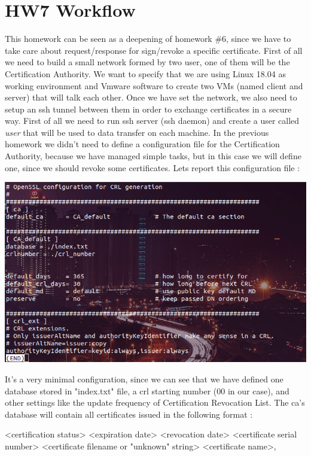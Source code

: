 \documentclass[11pt]{article}
\begin{document}
\section{HW7 Workflow}
This homework can be seen as a deepening of homework \#6, since we have to take care about request/response for sign/revoke a specific certificate. First of all we need to build a small network formed by two user, one of them will be the Certification Authority. We want to specify that we are using Linux 18.04 as working environment and Vmware software to create two VMs (named client and server) that will talk each other. Once we have set the network, we also need to setup an ssh tunnel between them in order to exchange certificates in a secure way. First of all we need to run ssh server (ssh daemon) and create a user called \textit{user} that will be used to data transfer on each machine. In the previous homework we didn't need to define a configuration file for the Certification Authority, because we have managed simple tasks, but in this case we will define one, since we should revoke some certificates. Lets report this configuration file :
\begin{center}
\includegraphics[scale=0.5]{./ca_config_file.png}
\end{center} 
It's a very minimal configuration, since we can see that we have defined one database stored in "index.txt" file, a crl starting number (00 in our case), and other settings like the update frequency of Certification Revocation List. The ca's database will contain all certificates issued in the following format :
\begin{center}
<certification status> <expiration date> <revocation date> <certificate serial number> <certificate filename or "unknown" string> <certificate name>,
\end{center}
\end{document}
